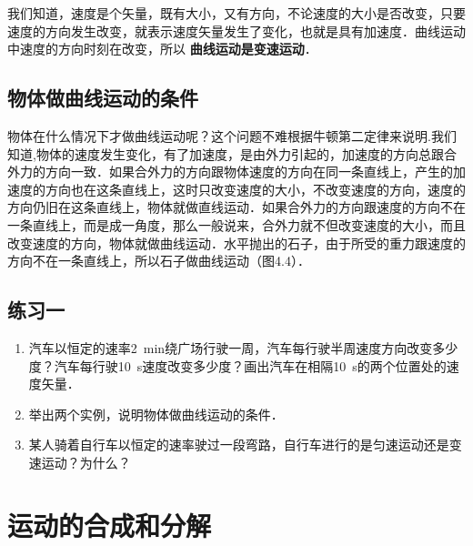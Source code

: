 我们知道，速度是个矢量，既有大小，又有方向，不论速度的大小是否改变，只要速度的方向发生改变，就表示速度矢量发生了变化，也就是具有加速度．曲线运动中速度的方向时刻在改变，所以\textbf{ 曲线运动是变速运动}．

\subsection{物体做曲线运动的条件}

物体在什么情况下才做曲线运动呢？这个问题不难根据牛顿第二定律来说明.我们知道,物体的速度发生变化，有了加速度，是由外力引起的，加速度的方向总跟合外力的方向一致．如果合外力的方向跟物体速度的方向在同一条直线上，产生的加速度的方向也在这条直线上，这时只改变速度的大小，不改变速度的方向，速度的方向仍旧在这条直线上，物体就做直线运动．如果合外力的方向跟速度的方向不在一条直线上，而是成一角度，那么一般说来，合外力就不但改变速度的大小，而且改变速度的方向，物体就做曲线运动．水平抛出的石子，由于所受的重力跟速度的方向不在一条直线上，所以石子做曲线运动（图4.4）．

\begin{figure}[H]
    \centering
    \caption{}
\end{figure}

\subsection*{练习一}

\begin{enumerate}
    \item 汽车以恒定的速率\SI{2}{min}绕广场行驶一周，汽车每行驶半周速度方向改变多少度？汽车每行驶\SI{10}{s}速度改变多少度？画出汽车在相隔\SI{10}{s}的两个位置处的速度矢量．
    \item 举出两个实例，说明物体做曲线运动的条件．
    \item 某人骑着自行车以恒定的速率驶过一段弯路，自行车进行的是匀速运动还是变速运动？为什么？
\end{enumerate}
\newpage
\section{运动的合成和分解}

